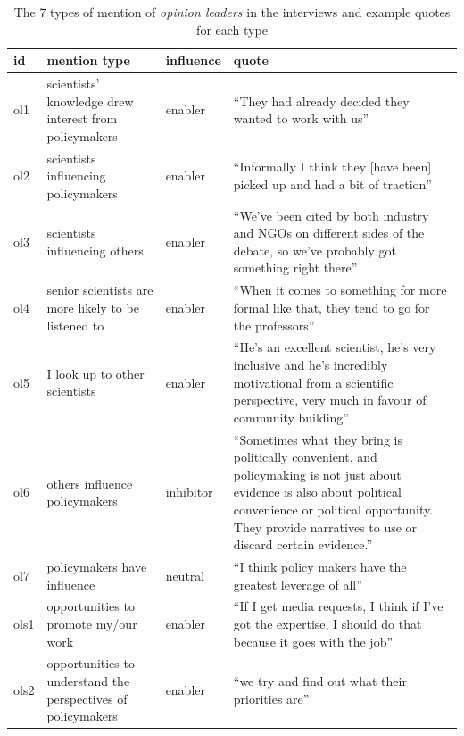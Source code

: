 \begin{table}[!ht]
\footnotesize
\caption{The 7 types of mention of \emph{opinion leaders} in the interviews and example quotes for each type}\label{tab:resopinionleaders}
\begin{tabular}{p{.08\linewidth}p{.3\linewidth}p{.1\linewidth}p{.42\linewidth}}\hline
\textbf{id} & \textbf{mention type} & \textbf{influence} & \textbf{quote} \\ \hline \hline 
ol1 & scientists' knowledge   drew interest from policymakers & enabler & ``They had already decided they wanted to   work with us''\index{p05}  \\[5mm]
ol2 & scientists influencing policymakers & enabler & ``Informally I think they [have been] picked up and had a bit of   traction''\index{p03}  \\[5mm]
ol3 & scientists influencing others & enabler & ``We've been cited by both industry and NGOs on different sides of   the debate, so we've probably got something right there''\index{p01} \\[5mm]
ol4 & senior scientists are more likely to be   listened to & enabler & ``When it comes to something for more formal like that, they tend to   go for the professors''\index{p03} \\[5mm]
ol5 & I look up to other scientists & enabler & ``He's an excellent scientist, he's very inclusive and he's   incredibly motivational from a scientific perspective, very much in favour of   community building''\index{p04} \\[5mm]
ol6 & others influence policymakers & inhibitor & ``Sometimes what they bring is politically convenient, and   policymaking is not just about evidence is also about political convenience   or political opportunity. They provide narratives to use or discard certain   evidence.''\index{p09}  \\[5mm]
ol7 & policymakers have influence & neutral & ``I think policy makers have the greatest leverage of   all''\index{p08}  \\[5mm] \hline
ols1 & opportunities to promote my/our work & enabler & ``If I get media requests, I think if I've got the expertise, I   should do that because it goes with the job''\index{p01}  \\[5mm]
ols2 &  opportunities to understand the perspectives of policymakers & enabler & ``we try and find out what their priorities are''\index{p12} \\[5mm] \hline
\end{tabular}
\end{table}

